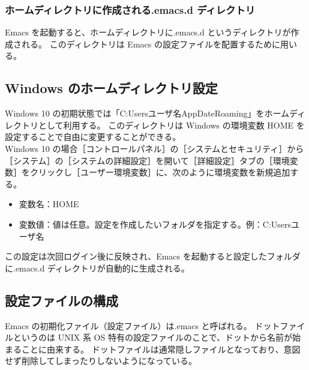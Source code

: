 \subsubsection{ホームディレクトリに作成される.emacs.d ディレクトリ}
Emacs を起動すると、ホームディレクトリに.emacs.d というディレクトリが作成される。
このディレクトリは Emacs の設定ファイルを配置するために用いる。
\subsection{Windows のホームディレクトリ設定}
Windows 10 の初期状態では「C:{\textyen}Users{\textyen}ユーザ名{\textyen}AppDate{\textyen}Roaming」をホームディレクトリとして利用する。
このディレクトリは Windows の環境変数 HOME を設定することで自由に変更することができる。\\

Windows 10 の場合［コントロールパネル］の［システムとセキュリティ］から［システム］の［システムの詳細設定］を開いて［詳細設定］タブの［環境変数］をクリックし［ユーザー環境変数］に、次のように環境変数を新規追加する。
\begin{itemize}\setlength{\leftskip}{-1.00zw}%
\item 変数名：HOME
\item 変数値：値は任意。設定を作成したいフォルダを指定する。例：C:{\textyen}Users{\textyen}ユーザ名
\end{itemize}
この設定は次回ログイン後に反映され、Emacs を起動すると設定したフォルダに.emacs.d ディレクトリが自動的に生成される。
\subsection{設定ファイルの構成}
Emacs の初期化ファイル（設定ファイル）は.emacs と呼ばれる。
ドットファイルというのは UNIX 系 OS 特有の設定ファイルのことで、ドットから名前が始まることに由来する。
ドットファイルは通常隠しファイルとなっており、意図せず削除してしまったりしないようになっている。\\

